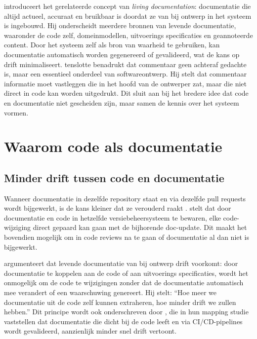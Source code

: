 \textcite{martraire2019livingdocumentation} introduceert het gerelateerde concept van \textit{living documentation}: documentatie die altijd actueel, accuraat en bruikbaar is doordat ze van bij ontwerp in het systeem is ingebouwd.
Hij onderscheidt meerdere bronnen van levende documentatie, waaronder de code zelf, domeinmodellen, uitvoerings specificaties en geannoteerde content.
Door het systeem zelf als bron van waarheid te gebruiken, kan documentatie automatisch worden gegenereerd of gevalideerd, wat de kans op drift minimaliseert.
\textcite{ousterhout2018philosophy} tenslotte benadrukt dat commentaar geen achteraf gedachte is, maar een essentieel onderdeel van softwareontwerp.
Hij stelt dat commentaar informatie moet vastleggen die in het hoofd van de ontwerper zat, maar die niet direct in code kan worden uitgedrukt.
Dit sluit aan bij het bredere idee dat code en documentatie niet gescheiden zijn, maar samen de kennis over het systeem vormen.

\section{Waarom code als documentatie}
\label{sec:cad-waarom}

\subsection{Minder drift tussen code en documentatie}
Wanneer documentatie in dezelfde repository staat en via dezelfde pull requests wordt bijgewerkt, is de kans kleiner dat ze verouderd raakt \autocite{gentle2017docslikecode}.
\textcite{gentle2017docslikecode} stelt dat door documentatie en code in hetzelfde versiebeheersysteem te bewaren, elke code-wijziging direct gepaard kan gaan met de bijhorende doc-update. Dit maakt het bovendien mogelijk om in code reviews na te gaan of documentatie al dan niet is bijgewerkt.

\textcite{martraire2019livingdocumentation} argumenteert dat levende documentatie van bij ontwerp drift voorkomt: door documentatie te koppelen aan de code of aan uitvoerings specificaties, wordt het onmogelijk om de code te wijzigingen zonder dat de documentatie automatisch mee verandert of een waarschuwing genereert.
Hij stelt: ``Hoe meer we documentatie uit de code zelf kunnen extraheren, hoe minder drift we zullen hebben.''
Dit principe wordt ook onderschreven door \textcite{theunissen2022mappingdocumentation}, die in hun mapping studie vaststellen dat documentatie die dicht bij de code leeft en via CI/CD-pipelines wordt gevalideerd, aanzienlijk minder snel drift vertoont.

